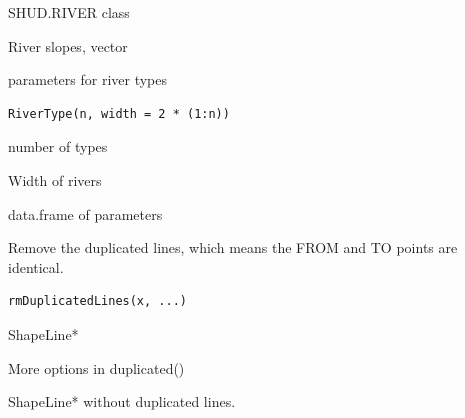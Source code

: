 \documentclass[a4paper]{book}
\begin{document}
%
\begin{Arguments}
\begin{ldescription}
\item[\code{pr}] SHUD.RIVER class
\end{ldescription}
\end{Arguments}
%
\begin{Value}
River slopes, vector
\end{Value}
%
\begin{Description}\relax
parameters for river types
\end{Description}
%
\begin{Usage}
\begin{verbatim}
RiverType(n, width = 2 * (1:n))
\end{verbatim}
\end{Usage}
%
\begin{Arguments}
\begin{ldescription}
\item[\code{n}] number of types

\item[\code{width}] Width of rivers
\end{ldescription}
\end{Arguments}
%
\begin{Value}
data.frame of parameters
\end{Value}
%
\begin{Description}\relax
Remove the duplicated lines, which means the FROM and TO points are identical.
\end{Description}
%
\begin{Usage}
\begin{verbatim}
rmDuplicatedLines(x, ...)
\end{verbatim}
\end{Usage}
%
\begin{Arguments}
\begin{ldescription}
\item[\code{x}] ShapeLine*

\item[\code{...}] More options in duplicated()
\end{ldescription}
\end{Arguments}
%
\begin{Value}
ShapeLine* without duplicated lines.
\end{Value}
\end{document}
